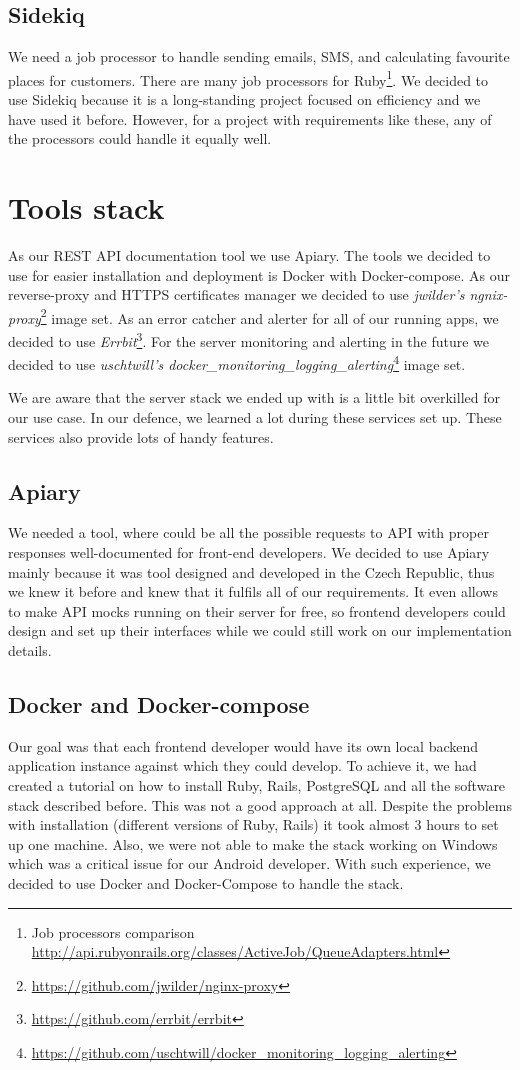 \subsection{Sidekiq}
We need a job processor to handle sending emails, SMS, and calculating favourite places for customers. 
There are many job processors for Ruby\footnote{ Job processors comparison \url{http://api.rubyonrails.org/classes/ActiveJob/QueueAdapters.html}}. We decided to use Sidekiq because it is a long-standing project focused on efficiency and we have used it before. However, for a project with requirements like these, any of the processors could handle it equally well. 
\section{Tools stack}
As our REST API documentation tool we use Apiary.
The tools we decided to use for easier installation and deployment is Docker with Docker-compose. As our reverse-proxy and HTTPS certificates manager we decided to use \textit{jwilder's ngnix-proxy}\footnote{\url{https://github.com/jwilder/nginx-proxy}} image set. As an error catcher and alerter for all of our running apps, we decided to use \textit{Errbit}\footnote{\url{https://github.com/errbit/errbit}}. For the server monitoring and alerting in the future we decided to use \textit{uschtwill's docker\_monitoring\_logging\_alerting}\footnote{\url{https://github.com/uschtwill/docker_monitoring_logging_alerting}} image set.


We are aware that the server stack we ended up with is a little bit overkilled for our use case. In our defence, we learned a lot during these services set up. These services also provide lots of handy features.
\subsection{Apiary}
We needed a tool, where could be all the possible requests to API with proper responses well-documented for front-end developers. We decided to use Apiary mainly because it was tool designed and developed in the Czech Republic, thus we knew it before and knew that it fulfils all of our requirements. It even allows to make API mocks running on their server for free, so frontend developers could design and set up their interfaces while we could still work on our implementation details.
\subsection{Docker and Docker-compose}
Our goal was that each frontend developer would have its own local backend application instance against which they could develop. To achieve it, we had created a tutorial on how to install Ruby, Rails, PostgreSQL and all the software stack described before. This was not a good approach at all. Despite the problems with installation (different versions of Ruby, Rails) it took almost 3 hours to set up one machine. Also, we were not able to make the stack working on Windows which was a critical issue for our Android developer. With such experience, we decided to use Docker and Docker-Compose to handle the stack.

